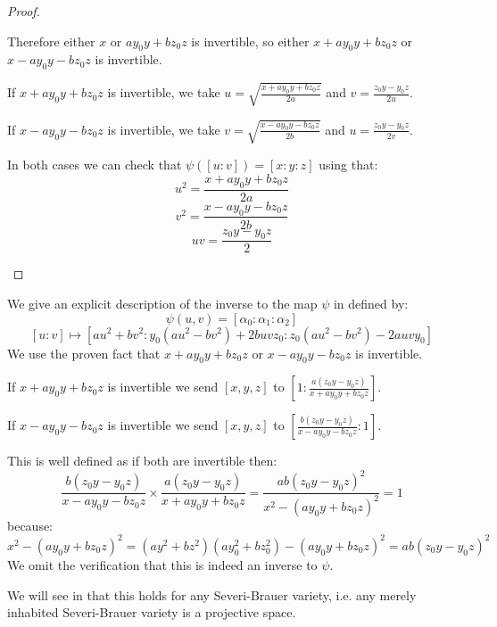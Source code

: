\begin{proof}
\begin{itemize}
Therefore either $x$ or $ay_0y+bz_0z$ is invertible, so either $x+ay_0y+bz_0z$ or $x-ay_0y-bz_0z$ is invertible.

If $x+ay_0y+bz_0z$ is invertible, we take $u=\sqrt{\frac{x+ay_0y+bz_0z}{2a}}$ and $v = \frac{z_0y-y_0z}{2u}$.

If $x-ay_0y-bz_0z$ is invertible, we take $v=\sqrt{\frac{x-ay_0y-bz_0z}{2b}}$ and $u = \frac{z_0y-y_0z}{2v}$.

In both cases we can check that $\psi([u:v]) = [x:y:z]$ using that:
\[u^2 = \frac{x+ay_0y+bz_0z}{2a}\]
\[v^2 = \frac{x-ay_0y-bz_0z}{2b}\]
\[uv = \frac{z_0y-y_0z}{2}\]
\end{itemize}
\end{proof}


\begin{remark}
We give an explicit description of the inverse to the map $\psi$ in  defined by:
\[\psi(u,v) = [\alpha_0:\alpha_1:\alpha_2]\]
\[[u:v] \mapsto [au^2+bv^2: y_0(au^2-bv^2) + 2buvz_0 : z_0(au^2-bv^2) - 2auvy_0]\]
We use the proven fact that $x+ay_0y+bz_0z$ or $x-ay_0y-bz_0z$ is invertible.

If $x + ay_0y + bz_0z$ is invertible we send $[x,y,z]$ to $[1:\frac{a(z_0y-y_0z)}{x + ay_0y + bz_0z}]$.

If $x - ay_0y - bz_0z$ is invertible we send $[x,y,z]$ to $[\frac{b(z_0y-y_0z)}{x - ay_0y - bz_0z}:1]$.

This is well defined as if both are invertible then:
\[\frac{b(z_0y-y_0z)}{x - ay_0y - bz_0z}\times\frac{a(z_0y-y_0z)}{x + ay_0y + bz_0z} = \frac{ab(z_0y-y_0z)^2}{x^2 - (ay_0y + bz_0z)^2} = 1\]
because:
\[x^2 - (ay_0y + bz_0z)^2 = (ay^2+bz^2)(ay_0^2+bz_0^2) - (ay_0y + bz_0z)^2 = ab(z_0y-y_0z)^2\]
We omit the verification that this is indeed an inverse to $\psi$.
\end{remark}

\begin{remark}
We will see in  that this holds for any Severi-Brauer variety, i.e. any merely inhabited Severi-Brauer variety is a projective space. 
\end{remark}